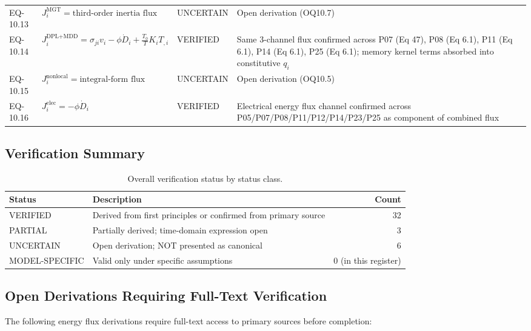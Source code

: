 \begin{table}[h]
\begin{tabularx}{\textwidth}{@{}lXll@{}}
EQ-10.13 & $J_i^{\text{MGT}} = \text{third-order inertia flux}$ & UNCERTAIN & Open derivation (OQ10.7) \\
EQ-10.14 & $J_i^{\text{DPL+MDD}} = \sigma_{ji}v_i - \phi\dot{D}_i + \frac{T_0}{T}K_i T_{,i}$ & VERIFIED & Same 3-channel flux confirmed across P07 (Eq 47), P08 (Eq 6.1), P11 (Eq 6.1), P14 (Eq 6.1), P25 (Eq 6.1); memory kernel terms absorbed into constitutive $q_i$ \\
EQ-10.15 & $J_i^{\text{nonlocal}} = \text{integral-form flux}$ & UNCERTAIN & Open derivation (OQ10.5) \\
EQ-10.16 & $J_i^{\text{elec}} = -\phi\dot{D}_i$ & VERIFIED & Electrical energy flux channel confirmed across P05/P07/P08/P11/P12/P14/P23/P25 as component of combined flux \\
\bottomrule
\end{tabularx}
\end{table}

\subsection{Verification Summary}

\begin{table}[h]
\centering
\small
\caption{Overall verification status by status class.}
\label{tab:appA-summary}
\begin{tabularx}{\textwidth}{@{}lXr@{}}
\toprule
\textbf{Status} & \textbf{Description} & \textbf{Count} \\
\midrule
VERIFIED & Derived from first principles or confirmed from primary source & 32 \\
PARTIAL & Partially derived; time-domain expression open & 3 \\
UNCERTAIN & Open derivation; NOT presented as canonical & 6 \\
MODEL-SPECIFIC & Valid only under specific assumptions & 0 (in this register) \\
\bottomrule
\end{tabularx}
\end{table}

\subsection{Open Derivations Requiring Full-Text Verification}

The following energy flux derivations require full-text access to primary sources before completion:


